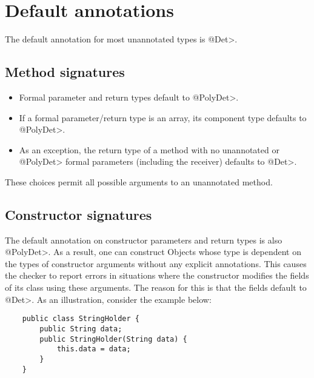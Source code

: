 \section{Default annotations\label{determinism-defaults}}

The default annotation for most unannotated types is \<@Det>.

\subsection{Method signatures\label{determinism-method-defaults}}
\begin{itemize}
\item
  Formal parameter and return types default to \<@PolyDet>.
\item
  If a formal parameter/return type is an array, its component type defaults to
  \<@PolyDet>.
\item
  As an exception, the return type of a method with no unannotated or
  \<@PolyDet> formal parameters (including the receiver) defaults to
  \<@Det>.
\end{itemize}

These choices permit all possible arguments to an unannotated method.

\subsection{Constructor signatures\label{determinism-constructor-defaults}}
The default annotation on constructor parameters and return types is also \<@PolyDet>.
As a result, one can construct Objects whose type
is dependent on the types of constructor arguments without any explicit
annotations. This causes the checker
to report errors in situations where the constructor modifies the fields of its class
using these arguments. The reason for this is that the fields default to \<@Det>.
As an illustration, consider the example below:

\begin{Verbatim}
    public class StringHolder {
        public String data;
        public StringHolder(String data) {
            this.data = data;
        }
    }
\end{Verbatim}

